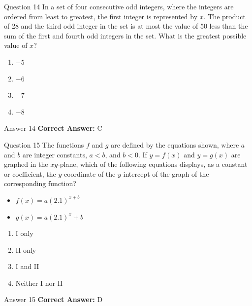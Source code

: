 \documentclass{beamer}
\begin{document}
\begin{frame}{Question 14}
\small
In a set of four consecutive odd integers, where the integers are ordered from least to greatest, the first integer is represented by $x$. The product of 28 and the third odd integer in the set is at most the value of 50 less than the sum of the first and fourth odd integers in the set. What is the greatest possible value of $x$?
\vspace{0.35cm}
\begin{enumerate}
    \item[A.] $-5$
    \item[B.] $-6$
    \item[C.] $-7$
    \item[D.] $-8$
\end{enumerate}
\end{frame}
\begin{frame}{Answer 14}
\small
\textbf{Correct Answer:} C
\end{frame}

\begin{frame}{Question 15}
\small
The functions \(f\) and \(g\) are defined by the equations shown, where \(a\) and \(b\) are integer constants, \(a < b\), and \(b < 0\). If \(y = f(x)\) and \(y = g(x)\) are graphed in the \(xy\)-plane, which of the following equations displays, as a constant or coefficient, the \(y\)-coordinate of the \(y\)-intercept of the graph of the corresponding function?

\begin{itemize}
    \item[I.] \(f(x) = a(2.1)^{x + b}\)
    \item[II.] \(g(x) = a(2.1)^x + b\)
\end{itemize}
\vspace{0.35cm}
\begin{enumerate}
    \item[A.] I only
    \item[B.] II only
    \item[C.] I and II
    \item[D.] Neither I nor II
\end{enumerate}
\end{frame}
\begin{frame}{Answer 15}
\small
\textbf{Correct Answer:} D
\end{frame}
\end{document}
